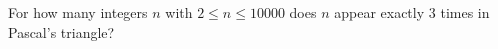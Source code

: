 For how many integers $n$ with $2\le n\le10000$ does $n$ appear exactly $3$ times in Pascal's triangle?
